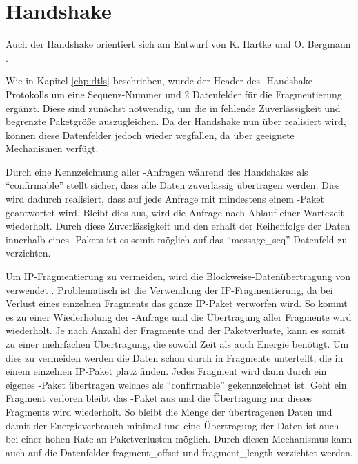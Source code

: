 \section{Handshake}
\label{sec:handshake}

Auch der Handshake orientiert sich am Entwurf von K. Hartke und O. Bergmann \cite[Kapitel 4]{draftcodtls}.

Wie in Kapitel \ref{chp:dtls} beschrieben, wurde der Header des -Handshake-Protokolls um eine Sequenz-Nummer
und 2 Datenfelder für die Fragmentierung ergänzt. Diese sind zunächst notwendig, um die in  fehlende Zuverlässigkeit
und begrenzte Paketgröße auszugleichen. Da der Handshake nun über  realisiert wird, können diese Datenfelder jedoch
wieder wegfallen, da  über geeignete Mechanismen verfügt.

Durch eine Kennzeichnung aller -Anfragen während des Handshakes als "`confirmable"' stellt  sicher, dass
alle Daten zuverlässig übertragen werden. Dies wird dadurch realisiert, dass auf jede Anfrage mit mindestens einem -Paket
geantwortet wird. Bleibt dies aus, wird die Anfrage nach Ablauf einer Wartezeit wiederholt. Durch diese Zuverlässigkeit und den
erhalt der Reihenfolge der Daten innerhalb eines -Pakets ist es somit möglich auf das "`message\_seq"' Datenfeld zu verzichten.

Um IP-Fragmentierung zu vermeiden, wird die Blockweise-Datenübertragung von  verwendet \cite{draftcoapblock}. Problematisch ist die Verwendung
der IP-Fragmentierung, da bei Verlust eines einzelnen Fragments das ganze IP-Paket verworfen wird. So kommt es zu einer Wiederholung
der -Anfrage und die Übertragung aller Fragmente wird wiederholt. Je nach Anzahl der Fragmente und der Paketverluste, kann
es somit zu einer mehrfachen Übertragung, die sowohl Zeit als auch Energie benötigt. Um dies zu vermeiden werden die Daten schon
durch  in Fragmente unterteilt, die in einem einzelnen IP-Paket platz finden. Jedes Fragment wird dann durch ein eigenes
-Paket übertragen welches als "`confirmable"' gekennzeichnet ist. Geht ein Fragment verloren bleibt das -Paket aus
und die Übertragung nur dieses Fragments wird wiederholt. So bleibt die Menge der übertragenen Daten und damit der Energieverbrauch
minimal und eine Übertragung der Daten ist auch bei einer hohen Rate an Paketverlusten möglich. Durch diesen Mechanismus kann auch
auf die Datenfelder fragment\_offset und fragment\_length verzichtet werden.

